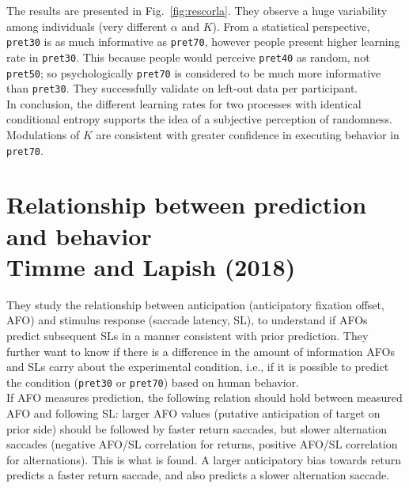 The results are presented in Fig.~\ref{fig:rescorla}.
They observe a huge variability among individuals (very different $\alpha$ and $K$). From a statistical perspective, \texttt{pret30} is as much informative as \texttt{pret70}, however people present higher learning rate in \texttt{pret30}. This because people would perceive \texttt{pret40} as random, not \texttt{pret50}; so psychologically \texttt{pret70} is considered to be much more informative than \texttt{pret30}.
They successfully validate on left-out data per participant.\\
In conclusion, the different learning rates for two processes with identical conditional entropy supports the idea of a subjective perception of randomness. Modulations of $K$ are consistent with greater confidence in executing behavior in \texttt{pret70}.


\section[Relationship between prediction and behavior]{Relationship between prediction and behavior\\ Timme and Lapish (2018)
}
They study the relationship between anticipation (anticipatory fixation offset, AFO) and stimulus response (saccade latency, SL), to understand if AFOs predict subsequent SLs in a manner consistent with prior prediction. They further want to know if there is a difference in the amount of information AFOs and SLs carry about the experimental condition, i.e., if it is possible to predict the condition (\texttt{pret30} or \texttt{pret70}) based on human behavior.\\

If AFO measures prediction, the following relation should hold between measured AFO and following SL: larger AFO values (putative anticipation of target on prior side) should be followed by faster return saccades, but slower alternation saccades (negative AFO/SL correlation for returns, positive AFO/SL correlation for alternations). This is what is found. A larger anticipatory bias towards return predicts a faster return saccade, and also predicts a slower alternation saccade.\\

